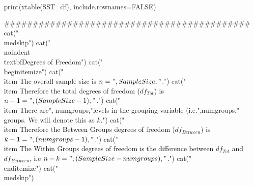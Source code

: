 print(xtable(SST_df), include.rownames=FALSE)



###########################################
cat("\n\\medskip")
cat("\n\n\\noindent \\textbf{Degrees of Freedom}") 
cat("\n\\begin{itemize}")
cat("\n\\item The overall sample size is $n = ",SampleSize,"$.")
cat("\n\\item Therefore the total degrees of freedom ($df_{Tot}$) is $n - 1 = ",(SampleSize-1),"$.")
cat("\n\\item There are", numgroups,"levels in the grouping variable (i.e.",numgroups," groups. We will denote this as $k$.")
cat("\n\\item Therefore the Between Groups degrees of freedom ($df_{Between}$) is $k - 1 = ",(numgroups-1),"$.")
cat("\n\\item The Within Groups degrees of freedom is the difference between $df_{Tot}$ and $df_{Between}$, i.e $n - k = ",(SampleSize - numgroups),"$.")
cat("\n\\end{itemize}")
cat("\n\\medskip")

